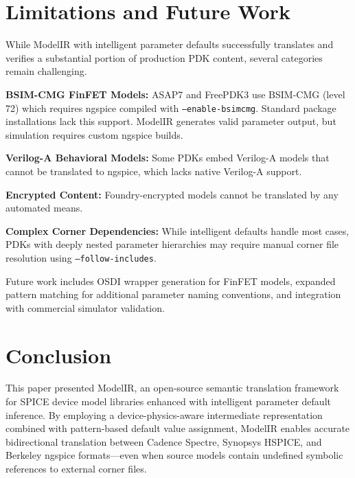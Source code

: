 \documentclass[conference]{IEEEtran}
\begin{document}
\section{Limitations and Future Work}
\label{sec:limitations}

While ModelIR with intelligent parameter defaults successfully translates and verifies a substantial portion of production PDK content, several categories remain challenging.

\textbf{BSIM-CMG FinFET Models:} ASAP7 and FreePDK3 use BSIM-CMG (level 72) which requires ngspice compiled with \texttt{--enable-bsimcmg}. Standard package installations lack this support. ModelIR generates valid parameter output, but simulation requires custom ngspice builds.

\textbf{Verilog-A Behavioral Models:} Some PDKs embed Verilog-A models that cannot be translated to ngspice, which lacks native Verilog-A support.

\textbf{Encrypted Content:} Foundry-encrypted models cannot be translated by any automated means.

\textbf{Complex Corner Dependencies:} While intelligent defaults handle most cases, PDKs with deeply nested parameter hierarchies may require manual corner file resolution using \texttt{--follow-includes}.

Future work includes OSDI wrapper generation for FinFET models, expanded pattern matching for additional parameter naming conventions, and integration with commercial simulator validation.

\section{Conclusion}
\label{sec:conclusion}

This paper presented ModelIR, an open-source semantic translation framework for SPICE device model libraries enhanced with intelligent parameter default inference. By employing a device-physics-aware intermediate representation combined with pattern-based default value assignment, ModelIR enables accurate bidirectional translation between Cadence Spectre, Synopsys HSPICE, and Berkeley ngspice formats---even when source models contain undefined symbolic references to external corner files.
\end{document}
